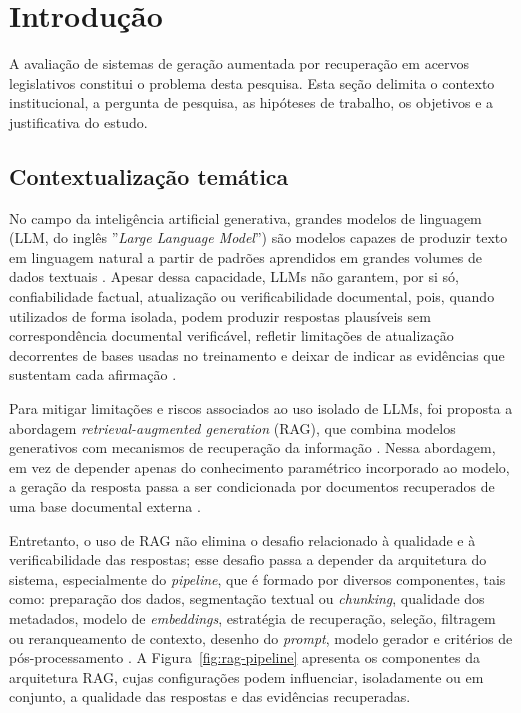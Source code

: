\section{Introdução}
\label{sec:introducao}

A avaliação de sistemas de geração aumentada por recuperação em acervos legislativos constitui o problema desta pesquisa. Esta seção delimita o contexto institucional, a pergunta de pesquisa, as hipóteses de trabalho, os objetivos e a justificativa do estudo.

\subsection{Contextualização temática}

No campo da inteligência artificial generativa, grandes modelos de linguagem (LLM, do inglês ''\textit{Large Language Model}'') são modelos capazes de produzir texto em linguagem natural a partir de padrões aprendidos em grandes volumes de dados textuais \parencite{brownEtAl2020fewShotLearners,zhaoEtAl2023llmSurvey,minaee2024llmSurvey}. Apesar dessa capacidade, LLMs não garantem, por si só, confiabilidade factual, atualização ou verificabilidade documental, pois, quando utilizados de forma isolada, podem produzir respostas plausíveis sem correspondência documental verificável, refletir limitações de atualização decorrentes de bases usadas no treinamento e deixar de indicar as evidências que sustentam cada afirmação \parencite{jiEtAl2023hallucinationSurvey,anhHoang2025hallucinations,dahlEtAl2024largeLegalFictions}.

Para mitigar limitações e riscos associados ao uso isolado de LLMs, foi proposta a abordagem \textit{retrieval-augmented generation} (RAG), que combina modelos generativos com mecanismos de recuperação da informação \parencite{lewisEtAl2020rag}. Nessa abordagem, em vez de depender apenas do conhecimento paramétrico incorporado ao modelo, a geração da resposta passa a ser condicionada por documentos recuperados de uma base documental externa \parencite{lewisEtAl2020rag,gao2023ragSurvey}.

Entretanto, o uso de RAG não elimina o desafio relacionado à qualidade e à verificabilidade das respostas; esse desafio passa a depender da arquitetura do sistema, especialmente do \textit{pipeline}, que é formado por diversos componentes, tais como: preparação dos dados, segmentação textual ou \textit{chunking}, qualidade dos metadados, modelo de \textit{embeddings}, estratégia de recuperação, seleção, filtragem ou reranqueamento de contexto, desenho do \textit{prompt}, modelo gerador e critérios de pós-processamento \parencite{gao2023ragSurvey,gupta2024comprehensiveRag,gao2024modularRag}. A Figura~\ref{fig:rag-pipeline} apresenta os componentes da arquitetura RAG, cujas configurações podem influenciar, isoladamente ou em conjunto, a qualidade das respostas e das evidências recuperadas. 

